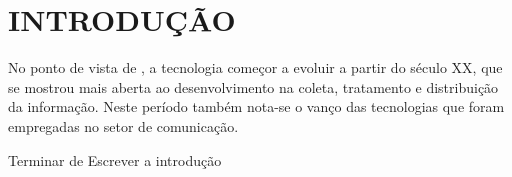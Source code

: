 
\chapter{INTRODUÇÃO}

\par No ponto de vista de , a tecnologia começor a
evoluir a partir do século XX, que se mostrou mais aberta ao desenvolvimento na
coleta, tratamento e distribuição da informação. Neste período também nota-se o
vanço das tecnologias que foram empregadas no setor de comunicação.

\par Terminar de Escrever a introdução